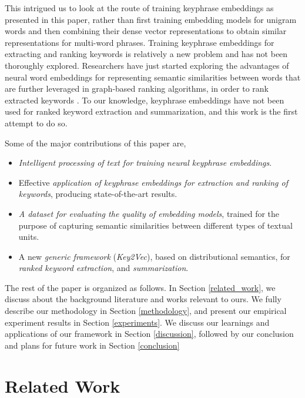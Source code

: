 \documentclass[conference]{IEEEtran}
\begin{document}
This intrigued us to look at the route of training keyphrase embeddings as presented in this paper, rather than first training embedding models for unigram words and then combining their dense vector representations to obtain similar representations for multi-word phrases. Training keyphrase embeddings for extracting and ranking keywords is relatively a new problem and has not been thoroughly explored. Researchers have just started exploring the advantages of neural word embeddings for representing semantic similarities between words that are further leveraged in graph-based ranking algorithms, in order to rank extracted keywords \cite{wang2015using}. To our knowledge, keyphrase embeddings have not been used for ranked keyword extraction and summarization, and this work is the first attempt to do so. 


Some of the major contributions of this paper are,
\begin{itemize}
  \item \textit{Intelligent processing of text for training neural keyphrase embeddings}.
  \item Effective \textit{application of keyphrase embeddings for extraction and ranking of keywords}, producing state-of-the-art results.
  \item \textit{A dataset for evaluating the quality of embedding models}, trained for the purpose of capturing semantic similarities between different types of textual units.
  \item A new \textit{generic framework} (\textit{Key2Vec}), based on distributional semantics, for \textit{ranked keyword extraction}, and \textit{summarization}.
\end{itemize}

The rest of the paper is organized as follows. In Section \ref{related_work}, we discuss about the background literature and works relevant to ours. We fully describe our methodology in Section \ref{methodology}, and present our empirical experiment results in Section \ref{experiments}. We discuss our learnings and applications of our framework in Section \ref{discussion}, followed by our conclusion and plans for future work in Section \ref{conclusion}

\section{Related Work\label{related_work}}
\end{document}

